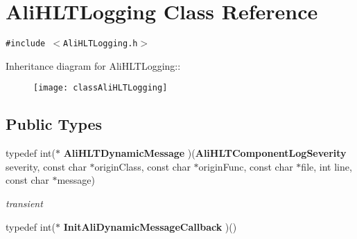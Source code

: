 \section{Ali\-HLTLogging Class Reference}
\label{classAliHLTLogging}
{\tt \#include $<$Ali\-HLTLogging.h$>$}

Inheritance diagram for Ali\-HLTLogging::\begin{figure}[H]
\begin{center}
\leavevmode
\texttt{[image: classAliHLTLogging]}
\end{center}
\end{figure}
\subsection*{Public Types}
\begin{CompactItemize}
\item 
typedef int($\ast$ {\bf Ali\-HLTDynamic\-Message} )({\bf Ali\-HLTComponent\-Log\-Severity} severity, const char $\ast$origin\-Class, const char $\ast$origin\-Func, const char $\ast$file, int line, const char $\ast$message)
\begin{CompactList}\small\item\em transient \item\end{CompactList}\item 
typedef int($\ast$ {\bf Init\-Ali\-Dynamic\-Message\-Callback} )()
\end{CompactItemize}
